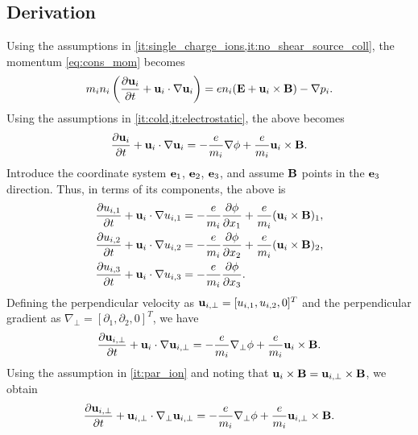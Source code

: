\documentclass[oneside,a4paper,11pt]{report}
\begin{document}
\subsection{Derivation}
Using the assumptions in \cref{it:single_charge_ions,it:no_shear_source_coll}, the momentum \cref{eq:cons_mom} becomes
\begin{equation}
    m_i n_i \left (\frac{\partial \mathbf{u}_i}{\partial t} + \mathbf{u}_i \cdot \nabla \mathbf{u}_i \right ) = e n_i (\mathbf{E} + \mathbf{u}_i \times \mathbf{B}) - \nabla p_i.
\end{equation}
Using the assumptions in \cref{it:cold,it:electrostatic}, the above becomes
\begin{equation}
    \frac{\partial \mathbf{u}_i}{\partial t} + \mathbf{u}_i \cdot \nabla \mathbf{u}_i = -\frac{e}{m_i} \nabla \phi + \frac{e}{m_i}\mathbf{u}_i \times \mathbf{B}.
\end{equation}
Introduce the coordinate system $\mathbf{e}_1$, $\mathbf{e}_2$, $\mathbf{e}_3$, and assume $\mathbf{B}$ points in the $\mathbf{e}_3$ direction. Thus, in terms of its components, the above is
\begin{align}
    \frac{\partial u_{i,1}}{\partial t} + \mathbf{u}_i \cdot \nabla u_{i,1} &= -\frac{e}{m_i} \frac{\partial \phi}{\partial x_1} + \frac{e}{m_i} (\mathbf{u}_i \times \mathbf{B})_1, \nonumber \\
    \frac{\partial u_{i,2}}{\partial t} + \mathbf{u}_i \cdot \nabla u_{i,2} &= -\frac{e}{m_i} \frac{\partial \phi}{\partial x_2} + \frac{e}{m_i} (\mathbf{u}_i \times \mathbf{B})_2, \nonumber \\
    \frac{\partial u_{i,3}}{\partial t} + \mathbf{u}_i \cdot \nabla u_{i,3} &= -\frac{e}{m_i} \frac{\partial \phi}{\partial x_3}.
\end{align}
Defining the perpendicular velocity as $\mathbf{u}_{i,\perp} = [u_{i,1}, u_{i,2}, 0]^T$ and the perpendicular gradient as $\nabla_\perp = [\partial_1, \partial_2, 0]^T$, we have
\begin{equation}
    \frac{\partial \mathbf{u}_{i,\perp}}{\partial t} + \mathbf{u}_i \cdot \nabla \mathbf{u}_{i,\perp} = -\frac{e}{m_i} \nabla_\perp \phi + \frac{e}{m_i}\mathbf{u}_i \times \mathbf{B}.
\end{equation}
Using the assumption in \cref{it:par_ion} and noting that $\mathbf{u}_{i} \times \mathbf{B} = \mathbf{u}_{i,\perp} \times \mathbf{B}$, we obtain
\begin{equation}
\label{eq:momentum_perpendicular}
    \frac{\partial \mathbf{u}_{i,\perp}}{\partial t} + \mathbf{u}_{i,\perp} \cdot \nabla_\perp \mathbf{u}_{i,\perp} = -\frac{e}{m_i} \nabla_\perp \phi + \frac{e}{m_i} \mathbf{u}_{i,\perp} \times \mathbf{B}.
\end{equation}
\end{document}
